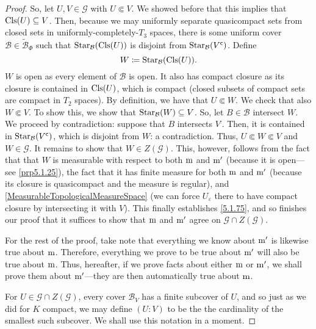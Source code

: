 \begin{thm}
\begin{proof}
So, let $U,V\in \mathcal{G}$ with $U\Subset V$.  We showed before that this implies that $\operatorname{Cls} (U)\subseteq V$.  Then, because we may uniformly separate quasicompact sets from closed sets in uniformly-completely-$T_3$ spaces, there is some uniform cover $\mathcal{B}\in \widetilde{\mathcal{B}}_{\Phi}$ such that $\operatorname{Star} _{\mathcal{B}}(\operatorname{Cls} (U))$ is disjoint from $\operatorname{Star} _{\mathcal{B}}(V^{\mathsf{c}})$.  Define
\begin{equation}
W\coloneqq \operatorname{Star} _{\mathcal{B}}(\operatorname{Cls} (U)).
\end{equation}
$W$ is open as every element of $\mathcal{B}$ is open.  It also has compact closure as its closure is contained in $\operatorname{Cls} (U)$, which is compact (closed subsets of compact sets are compact in $T_2$ spaces).  By definition, we have that $U\Subset W$.  We check that also $W\Subset V$.  To show this, we show that $\operatorname{Star} _{\mathcal{B}}(W)\subseteq V$.  So, let $B\in \mathcal{B}$ intersect $W$.  We proceed by contradiction:  suppose that $B$ intersects $V^{\comp}$.  Then, it is contained in $\operatorname{Star} _{\mathcal{B}}(V^{\mathsf{c}})$, which is disjoint from $W$:  a contradiction.  Thus, $U\Subset W\Subset V$ and $W\in \mathcal{G}$.  It remains to show that $W\in Z(\mathcal{G})$.  This, however, follows from the fact that that $W$ is measurable with respect to both $\mathrm{m}$ and $\mathrm{m} '$ (because it is open---see \cref{prp5.1.25}), the fact that it has finite measure for both $\mathrm{m}$ and $\mathrm{m} '$ (because its closure is quasicompact and the measure is regular), and \cref{MeasurableTopologicalMeasureSpace} (we can force $U_{\varepsilon}$ there to have compact closure by intersecting it with $V$).  This finally establishes \eqref{5.1.75}, and so finishes our proof that it suffices to show that $\mathrm{m}$ and $\mathrm{m} '$ agree on $\mathcal{G}\cap Z(\mathcal{G})$.

For the rest of the proof, take note that everything we know about $\mathrm{m} '$ is likewise true about $\mathrm{m}$.  Therefore, everything we prove to be true about $\mathrm{m} '$ will also be true about $\mathrm{m}$.  Thus, hereafter, if we prove facts about either $\mathrm{m}$ or $\mathrm{m} '$, we shall prove them about $\mathrm{m} '$---they are then automatically true about $\mathrm{m}$.

For $U\in \mathcal{G}\cap Z(\mathcal{G})$, every cover $\mathcal{B}_V$ has a finite subcover of $U$, and so just as we did for $K$ compact, we may define $(U:V)$ to be the the cardinality of the smallest such subcover.  We shall use this notation in a moment.


\end{proof}
\end{thm}
